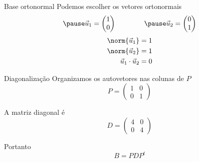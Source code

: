 \begin{resolution}{Base ortonormal}
  Podemos escolher os vetores ortonormais
  \[
    \pause
    \vec{u}_{1} =
    \begin{pmatrix}
      1 \\
      0
    \end{pmatrix}
    \qquad\qquad
    \pause
    \vec{u}_{2} =
    \begin{pmatrix}
      0 \\
      1
    \end{pmatrix}
  \]
  \pause
  \begin{align*}
    \norm{\vec{u}_{1}}          & =1 \\
    \norm{\vec{u}_{2}}          & =1 \\
    \vec{u}_{1}\cdot\vec{u}_{2} & =0
  \end{align*}
\end{resolution}

\begin{resolution}{Diagonalização}
  Organizamos os autovetores nas colunas de $P$
  \[
    P =
    \begin{pmatrix}
      1 & 0 \\
      0 & 1
    \end{pmatrix}
  \]

  A matriz diagonal é
  \[
    D =
    \begin{pmatrix}
      4 & 0 \\
      0 & 4
    \end{pmatrix}
  \]

  Portanto
  \[
    B = P D P^t
  \]
\end{resolution}

